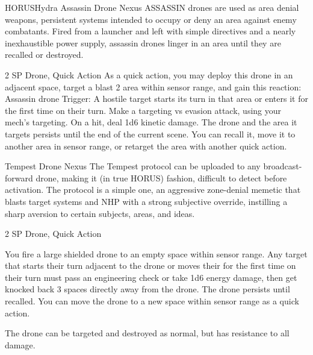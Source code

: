 \begin{mech}{HORUS}{Hydra}
Assassin Drone Nexus
ASSASSIN drones are used as area denial weapons, persistent systems intended to occupy or deny an area against enemy combatants. Fired from a launcher and left with simple directives and a nearly inexhaustible power supply, assassin drones linger in an area until they are recalled or destroyed.

2 SP
Drone, Quick Action
As a quick action, you may deploy this drone in an adjacent space, target a blast 2 area within sensor range, and gain this reaction:
Assassin drone
Trigger: A hostile target starts its turn in that area or enters it for the first time on their turn. Make a targeting vs evasion attack, using your mech’s targeting. On a hit, deal 1d6 kinetic damage.
The drone and the area it targets persists until the end of the current scene. You can recall it, move it to another area in sensor range, or retarget the area with another quick action.

Tempest Drone Nexus
The Tempest protocol can be uploaded to any broadcast-forward drone, making it (in true HORUS) fashion, difficult to detect before activation. The protocol is a simple one, an aggressive zone-denial memetic that blasts target systems and NHP with a strong subjective override, instilling a sharp aversion to certain subjects, areas, and ideas.

2 SP
Drone, Quick Action

You fire a large shielded drone to an empty space within sensor range. Any target that starts their turn adjacent to the drone or moves their for the first time on their turn must pass an engineering check or take 1d6 energy damage, then get knocked back 3 spaces directly away from the drone. The drone persists until recalled. You can move the drone to a new space within sensor range as a quick action.

The drone can be targeted and destroyed as normal, but has resistance to all damage.


\end{mech}
